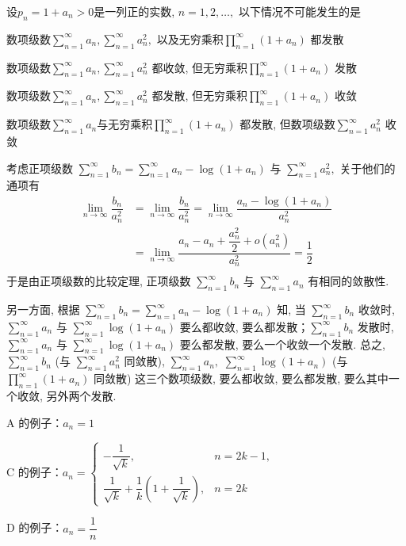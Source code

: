 \begin{question}
设$p_n = 1 + a_n > 0$是一列正的实数, $n = 1, 2, \dots,$ 以下情况不可能发生的是 \paren[B]

\begin{choices}
\item 数项级数$\displaystyle \sum\limits_{n=1}^{\infty} a_n, \sum\limits_{n=1}^{\infty} a_n^2,$ 以及无穷乘积$\displaystyle \prod\limits_{n=1}^{\infty} (1 + a_n)$ 都发散
\item 数项级数$\displaystyle \sum\limits_{n=1}^{\infty} a_n, \sum\limits_{n=1}^{\infty} a_n^2$ 都收敛, 但无穷乘积$\displaystyle \prod\limits_{n=1}^{\infty} (1 + a_n)$ 发散
\item 数项级数$\displaystyle \sum\limits_{n=1}^{\infty} a_n, \sum\limits_{n=1}^{\infty} a_n^2$ 都发散, 但无穷乘积$\displaystyle \prod\limits_{n=1}^{\infty} (1 + a_n)$ 收敛
\item 数项级数$\displaystyle \sum\limits_{n=1}^{\infty} a_n$与无穷乘积$\displaystyle \prod\limits_{n=1}^{\infty} (1 + a_n)$ 都发散, 但数项级数$\displaystyle \sum\limits_{n=1}^{\infty} a_n^2$ 收敛
\end{choices}
\end{question}

\begin{solution}
考虑正项级数 $\sum\limits_{n=1}^{\infty} b_n = \sum\limits_{n=1}^{\infty} a_n - \log(1 + a_n)$ 与 $\sum\limits_{n=1}^{\infty} a_n^2,$ 关于他们的通项有
\begin{align*}
\lim\limits_{n\to\infty} \dfrac{b_n}{a_n^2} & = \lim\limits_{n\to\infty} \dfrac{b_n}{a_n^2} = \lim\limits_{n\to\infty} \dfrac{a_n - \log(1 + a_n)}{a_n^2} \\
& = \lim\limits_{n\to\infty} \dfrac{a_n - a_n + \dfrac{a_n^2}{2} + o(a_n^2)}{a_n^2} = \dfrac{1}{2} \\
\end{align*}
于是由正项级数的比较定理, 正项级数 $\sum\limits_{n=1}^{\infty} b_n$ 与 $\sum\limits_{n=1}^{\infty} a_n$ 有相同的敛散性.

另一方面, 根据 $\sum\limits_{n=1}^{\infty} b_n = \sum\limits_{n=1}^{\infty} a_n - \log(1 + a_n)$ 知, 当 $\sum\limits_{n=1}^{\infty} b_n$ 收敛时, $\sum\limits_{n=1}^{\infty} a_n$ 与 $\sum\limits_{n=1}^{\infty} \log(1 + a_n)$ 要么都收敛, 要么都发散；$\sum\limits_{n=1}^{\infty} b_n$ 发散时, $\sum\limits_{n=1}^{\infty} a_n$ 与 $\sum\limits_{n=1}^{\infty} \log(1 + a_n)$ 要么都发散, 要么一个收敛一个发散. 总之, $\sum\limits_{n=1}^{\infty} b_n$ (与 $\sum\limits_{n=1}^{\infty} a_n^2$ 同敛散), $\sum\limits_{n=1}^{\infty} a_n,$ $\sum\limits_{n=1}^{\infty} \log(1 + a_n)$ (与 $\prod\limits_{n=1}^{\infty} (1 + a_n)$ 同敛散) 这三个数项级数, 要么都收敛, 要么都发散, 要么其中一个收敛, 另外两个发散.

A 的例子：$a_n = 1$

C 的例子：$a_n = \begin{cases}
-\dfrac{1}{\sqrt{k}}, & n = 2k -1, \\
\dfrac{1}{\sqrt{k}} + \dfrac{1}{k} \left( 1 + \dfrac{1}{\sqrt{k}} \right), & n = 2k
\end{cases}$

D 的例子：$a_n = \dfrac{1}{n}$
\end{solution}


